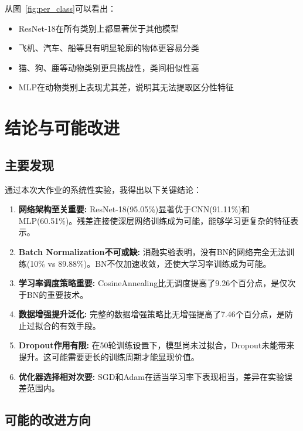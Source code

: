 \documentclass[12pt,a4paper]{article}
\begin{document}
从图~\ref{fig:per_class}可以看出：
\begin{itemize}[leftmargin=2em]
    \item ResNet-18在所有类别上都显著优于其他模型
    \item 飞机、汽车、船等具有明显轮廓的物体更容易分类
    \item 猫、狗、鹿等动物类别更具挑战性，类间相似性高
    \item MLP在动物类别上表现尤其差，说明其无法提取区分性特征
\end{itemize}

\section{结论与可能改进}

\subsection{主要发现}

通过本次大作业的系统性实验，我得出以下关键结论：

\begin{enumerate}[leftmargin=2em]
    \item \textbf{网络架构至关重要:} ResNet-18(95.05\%)显著优于CNN(91.11\%)和MLP(60.51\%)。残差连接使深层网络训练成为可能，能够学习更复杂的特征表示。
    
    \item \textbf{Batch Normalization不可或缺:} 消融实验表明，没有BN的网络完全无法训练(10\% vs 89.88\%)。BN不仅加速收敛，还使大学习率训练成为可能。
    
    \item \textbf{学习率调度策略重要:} CosineAnnealing比无调度提高了9.26个百分点，是仅次于BN的重要技术。
    
    \item \textbf{数据增强提升泛化:} 完整的数据增强策略比无增强提高了7.46个百分点，是防止过拟合的有效手段。
    
    \item \textbf{Dropout作用有限:} 在50轮训练设置下，模型尚未过拟合，Dropout未能带来提升。这可能需要更长的训练周期才能显现价值。
    
    \item \textbf{优化器选择相对次要:} SGD和Adam在适当学习率下表现相当，差异在实验误差范围内。
\end{enumerate}

\subsection{可能的改进方向}
\end{document}
